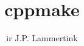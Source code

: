 \newcommand*{\BOOKCLASS}{}


\title{cppmake}
\author{ir J.P. Lammertink}
\maketitle
\tableofcontents




